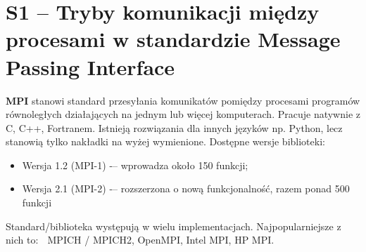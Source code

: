 \section{S1 -- Tryby komunikacji między procesami w standardzie Message Passing Interface}

\textbf{MPI} stanowi standard przesyłania komunikatów pomiędzy procesami programów równoległych działających na jednym lub więcej komputerach. Pracuje natywnie z C, C++, Fortranem. Istnieją rozwiązania dla innych języków np. Python, lecz stanowią tylko nakładki na wyżej wymienione. Dostępne wersje biblioteki:
\begin{itemize}
\item Wersja 1.2 (MPI-1) -– wprowadza około 150 funkcji;
\item Wersja 2.1 (MPI-2) -– rozszerzona o nową funkcjonalność, razem ponad 500 funkcji
\end{itemize}

Standard/biblioteka występują w wielu implementacjach. Najpopularniejsze z nich to:  MPICH / MPICH2, OpenMPI, Intel MPI, HP MPI. 

